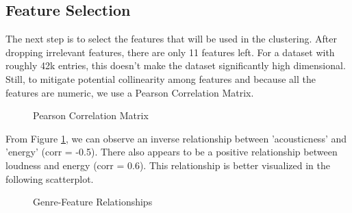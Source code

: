 \documentclass[conference]{IEEEtran}
\begin{document}
\subsection{Feature Selection}
The next step is to select the features that will be used in the clustering. After dropping irrelevant features, there are only 11 features left. For a dataset with roughly 42k entries, this doesn't make the dataset significantly high dimensional. Still, to mitigate potential collinearity among features and because all the features are numeric, we use a Pearson Correlation Matrix. 

\begin{figure}[!ht]
    \begin{center}
    \end{center}
    \caption{Pearson Correlation Matrix}
    \label{fig:corr_matrix}
\end{figure}

From Figure \ref{fig:corr_matrix}, we can observe an inverse relationship between 'acousticness' and 'energy' (corr = -0.5). There also appears to be a positive relationship between loudness and energy (corr = 0.6). This relationship is better visualized in the following scatterplot. 

\begin{figure}[!ht]
    \begin{center}
    \end{center}
    \caption{Genre-Feature Relationships}
    \label{fig:corr-scatter}
\end{figure}
\end{document}
